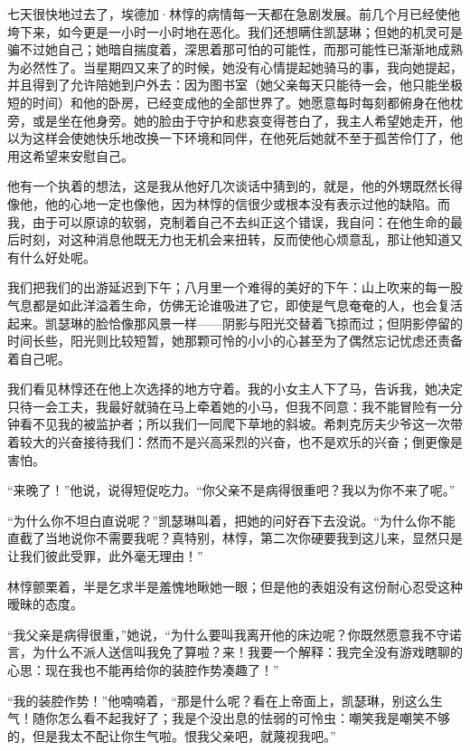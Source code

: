 \par 七天很快地过去了，埃德加·林惇的病情每一天都在急剧发展。前几个月已经使他垮下来，如今更是一小时一小时地在恶化。我们还想瞒住凯瑟琳；但她的机灵可是骗不过她自己；她暗自揣度着，深思着那可怕的可能性，而那可能性已渐渐地成熟为必然性了。当星期四又来了的时候，她没有心情提起她骑马的事，我向她提起，并且得到了允许陪她到户外去：因为图书室（她父亲每天只能待一会，他只能坐极短的时间）和他的卧房，已经变成他的全部世界了。她愿意每时每刻都俯身在他枕旁，或是坐在他身旁。她的脸由于守护和悲哀变得苍白了，我主人希望她走开，他以为这样会使她快乐地改换一下环境和同伴，在他死后她就不至于孤苦伶仃了，他用这希望来安慰自己。
\par 他有一个执着的想法，这是我从他好几次谈话中猜到的，就是，他的外甥既然长得像他，他的心地一定也像他，因为林惇的信很少或根本没有表示过他的缺陷。而我，由于可以原谅的软弱，克制着自己不去纠正这个错误，我自问：在他生命的最后时刻，对这种消息他既无力也无机会来扭转，反而使他心烦意乱，那让他知道又有什么好处呢。
\par 我们把我们的出游延迟到下午；八月里一个难得的美好的下午：山上吹来的每一股气息都是如此洋溢着生命，仿佛无论谁吸进了它，即使是气息奄奄的人，也会复活起来。凯瑟琳的脸恰像那风景一样——阴影与阳光交替着飞掠而过；但阴影停留的时间长些，阳光则比较短暂，她那颗可怜的小小的心甚至为了偶然忘记忧虑还责备着自己呢。
\par 我们看见林惇还在他上次选择的地方守着。我的小女主人下了马，告诉我，她决定只待一会工夫，我最好就骑在马上牵着她的小马，但我不同意：我不能冒险有一分钟看不见我的被监护者；所以我们一同爬下草地的斜坡。希刺克厉夫少爷这一次带着较大的兴奋接待我们：然而不是兴高采烈的兴奋，也不是欢乐的兴奋；倒更像是害怕。
\par “来晚了！”他说，说得短促吃力。“你父亲不是病得很重吧？我以为你不来了呢。”
\par “为什么你不坦白直说呢？”凯瑟琳叫着，把她的问好吞下去没说。“为什么你不能直截了当地说你不需要我呢？真特别，林惇，第二次你硬要我到这儿来，显然只是让我们彼此受罪，此外毫无理由！”
\par 林惇颤栗着，半是乞求半是羞愧地瞅她一眼；但是他的表姐没有这份耐心忍受这种暧昧的态度。
\par “我父亲是病得很重，”她说，“为什么要叫我离开他的床边呢？你既然愿意我不守诺言，为什么不派人送信叫我免了算啦？来！我要一个解释：我完全没有游戏瞎聊的心思：现在我也不能再给你的装腔作势凑趣了！”
\par “我的装腔作势！”他喃喃着，“那是什么呢？看在上帝面上，凯瑟琳，别这么生气！随你怎么看不起我好了；我是个没出息的怯弱的可怜虫：嘲笑我是嘲笑不够的，但是我太不配让你生气啦。恨我父亲吧，就蔑视我吧。”
